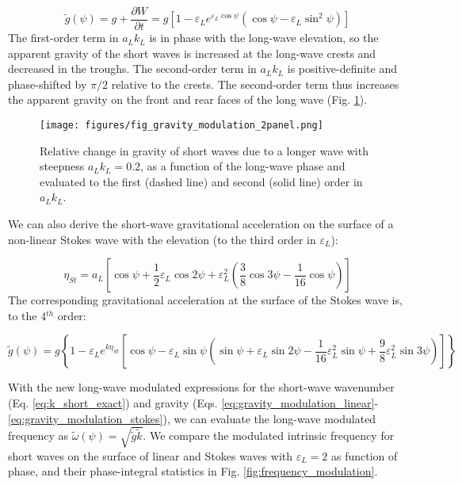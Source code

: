 \documentclass[draft]{agujournal2019}
\begin{document}
\begin{equation}
\label{eq:gravity_modulation_linear}
\widetilde{g}(\psi) = g + \dfrac{\partial W}{\partial t} = g \left[
  1 - \varepsilon_L e^{\varepsilon_L \cos{\psi}} \left(
    \cos{\psi} - \varepsilon_L \sin^2{\psi}
  \right)
\right]
\end{equation}
The first-order term in $a_L k_L$ is in phase with the long-wave elevation,
so the apparent gravity of the short waves is increased at the long-wave crests
and decreased in the troughs.
The second-order term in $a_L k_L$ is positive-definite and phase-shifted by
$\pi/2$ relative to the crests.
The second-order term thus increases the apparent gravity on the front and rear
faces of the long wave (Fig. \ref{fig:gravity_modulation}).

\begin{figure}[h]
\label{fig:gravity_modulation}
\centering
\texttt{[image: figures/fig\_gravity\_modulation\_2panel.png]}
\caption{
  Relative change in gravity of short waves due to a longer wave with steepness $a_L k_L = 0.2$,
  as a function of the long-wave phase and evaluated to the first (dashed line) and second (solid line) order in $a_L k_L$.
}
\end{figure}

We can also derive the short-wave gravitational acceleration on the surface of
a non-linear Stokes wave with the elevation (to the third order in $\varepsilon_L$):

\begin{equation}
\label{eq:eta_stokes}
\eta_{St} = a_L \left[
  \cos{\psi} +
  \dfrac{1}{2} \varepsilon_L \cos{2\psi} +
  \varepsilon_L^2 \left( \dfrac{3}{8} \cos{3\psi} - \dfrac{1}{16} \cos{\psi} \right)
\right]
\end{equation}
The corresponding gravitational acceleration at the surface of the Stokes wave
is, to the 4$^{th}$ order:

\begin{equation}
\label{eq:gravity_modulation_stokes}
\widetilde{g}(\psi) =
g \left\{
  1 - \varepsilon_L e^{k \eta_{St}}
  \left[ \cos{\psi} -
    \varepsilon_L \sin{\psi} \left(
      \sin{\psi}
      + \varepsilon_L \sin{2\psi}
      - \dfrac{1}{16} \varepsilon_L^2 \sin{\psi}
      + \dfrac{9}{8} \varepsilon_L^2 \sin{3\psi}
    \right)
  \right]
\right\}
\end{equation}

With the new long-wave modulated expressions for the short-wave wavenumber
(Eq. \ref{eq:k_short_exact}) and gravity
(Eqs. \ref{eq:gravity_modulation_linear}-\ref{eq:gravity_modulation_stokes}),
we can evaluate the long-wave modulated frequency as
$\widetilde{\omega}(\psi) = \sqrt{\widetilde{g} \widetilde{k}}$.
We compare the modulated intrinsic frequency for short waves on the surface of
linear and Stokes waves with $\varepsilon_L=2$ as function of phase, and their
phase-integral statistics in Fig. \ref{fig:frequency_modulation}.
\end{document}
